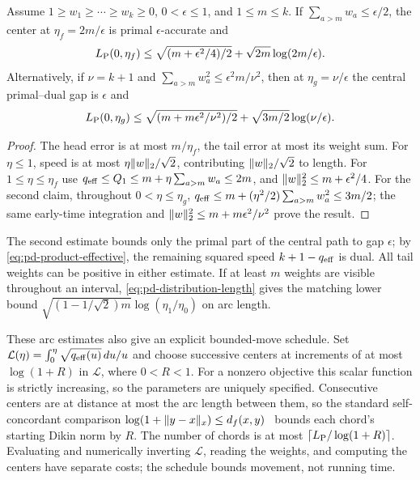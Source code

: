 \begin{proposition}
\label{prop:pd-effective-support}
Assume $1\geq w_1\geq\cdots\geq w_k\geq0$,
$0<\epsilon\leq1$, and $1\leq m\leq k$.
If $\sum_{a>m}w_a\leq\epsilon/2$, the center at
$\eta_f=2m/\epsilon$ is primal $\epsilon$-accurate and
\begin{equation}\label{eq:pd-head-tail}
 L_{\rm P}(0,\eta_f)
 \leq\sqrt{(m+\epsilon^2/4)/2}
       +\sqrt{2m}\log(2m/\epsilon).
\end{equation}
Alternatively, if $\nu=k+1$ and
$\sum_{a>m}w_a^2\leq\epsilon^2m/\nu^2$, then at
$\eta_g=\nu/\epsilon$ the central primal--dual gap is $\epsilon$ and
\begin{equation}\label{eq:pd-full-gap-tail}
 L_{\rm P}(0,\eta_g)
 \leq\sqrt{(m+m\epsilon^2/\nu^2)/2}
       +\sqrt{3m/2}\log(\nu/\epsilon).
\end{equation}
\end{proposition}
\begin{proof}
The head error is at most $m/\eta_f$, the tail error at most its
weight sum. For $\eta\leq1$, speed is at most
$\eta\lVert w\rVert_2/\sqrt2$, contributing $\lVert w\rVert_2/\sqrt2$ to
length. For $1\leq\eta\leq\eta_f$ use
$q_{\rm eff}\leq Q_1\leq m+\eta\sum_{a>m}w_a\leq2m$,
and $\lVert w\rVert_2^2\leq m+\epsilon^2/4$.
For the second claim, throughout $0<\eta\leq\eta_g$,
$q_{\rm eff}\leq m+(\eta^2/2)\sum_{a>m}w_a^2\leq3m/2$;
the same early-time integration and
$\lVert w\rVert_2^2\leq m+m\epsilon^2/\nu^2$ prove the result.
\end{proof}
The second estimate bounds only the primal part of the central path to
gap $\epsilon$; by \eqref{eq:pd-product-effective}, the remaining
squared speed $k+1-q_{\rm eff}$ is dual. All tail
weights can be positive in either estimate. If at least $m$ weights are
visible throughout an interval, \eqref{eq:pd-distribution-length} gives
the matching lower bound $\sqrt{(1-1/\sqrt2)m}\log(\eta_1/\eta_0)$ on
arc length.

These arc estimates also give an explicit bounded-move schedule. Set
$\mathcal L(\eta)=\int_0^\eta\sqrt{q_{\rm eff}(u)}\,du/u$ and
choose successive centers at increments of at most $\log(1+R)$ in
$\mathcal L$, where $0<R<1$. For a nonzero objective this scalar
function is strictly increasing, so the parameters are uniquely
specified. Consecutive centers are at distance at most the arc length
between them, so the standard self-concordant comparison
$\log(1+\lVert y-x\rVert_x)\leq d_f(x,y)$~\cite[Section~3]{NT2002} bounds
each chord's starting Dikin norm by $R$.
The number of chords is at most
$\lceil L_{\rm P}/\log(1+R)\rceil$. Evaluating and numerically
inverting $\mathcal L$, reading the weights, and computing the centers
have separate costs; the schedule bounds movement, not running time.


